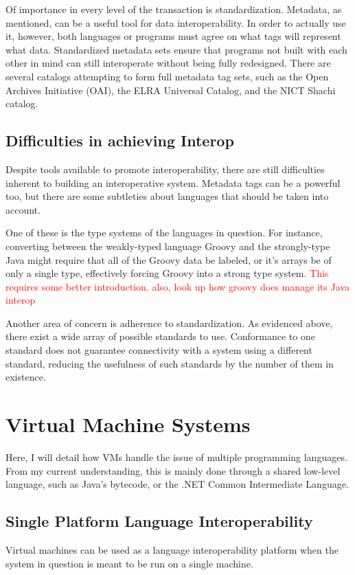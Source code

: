 \documentclass{sig-alternate}
\newcommand{\mycomment}[1]{\textcolor{red}{#1}}
\begin{document}
Of importance in every level of the transaction is standardization. Metadata, as mentioned, can be a useful tool for data interoperability. In order to actually use it, however, both languages or programs must agree on what tags will represent what data. Standardized metadata sets ensure that programs not built with each other in mind can still interoperate without being fully redesigned. There are several catalogs attempting to form full metadata tag sets, such as the Open Archives Initiative (OAI), the ELRA Universal Catalog, and the NICT Shachi catalog.\cite{Ide:2010}

\subsection*{Difficulties in achieving Interop}
Despite tools available to promote interoperability, there are still difficulties inherent to building an interoperative system. Metadata tags can be a powerful too, but there are some subtleties about languages that should be taken into account.

One of these is the type systems of the languages in question. For instance, converting between the weakly-typed language Groovy and the strongly-type Java might require that all of the Groovy data be labeled, or it's arrays be of only a single type, effectively forcing Groovy into a strong type system. \mycomment{This requires some better introduction. also, look up how groovy does manage its Java interop}

Another area of concern is adherence to standardization.
As evidenced above, there exist a wide array of possible standards to use. Conformance to one standard does not guarantee connectivity with a system using a different standard, reducing the usefulness of such standards by the number of them in existence.\cite{?}



\section{Virtual Machine Systems}\label{VM}
Here, I will detail how VMs handle the issue of multiple programming languages.
From my current understanding, this is mainly done through a shared low-level language, such as Java's bytecode, or the .NET Common Intermediate Language.


\subsection*{Single Platform Language Interoperability}
Virtual machines can be used as a language interoperability platform when the system in question is meant to be run on a single machine. 
\end{document}
